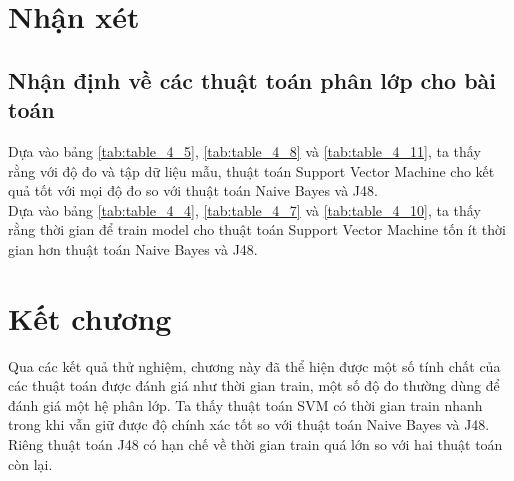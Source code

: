 \section{Nhận xét}
	\subsection{Nhận định về các thuật toán phân lớp cho bài toán}
	Dựa vào bảng \ref{tab:table_4_5}, \ref{tab:table_4_8} và \ref{tab:table_4_11}, ta thấy rằng với độ đo và tập dữ liệu mẫu, thuật toán Support Vector Machine cho kết quả tốt với mọi độ đo so với thuật toán Naive Bayes và J48.\\
	Dựa vào bảng \ref{tab:table_4_4}, \ref{tab:table_4_7} và \ref{tab:table_4_10}, ta thấy rằng thời gian để train model cho thuật toán Support Vector Machine tốn ít thời gian hơn thuật toán Naive Bayes và J48.
\section{Kết chương}
Qua các kết quả thử nghiệm, chương này đã thể hiện được một số tính chất của các thuật toán được đánh giá như thời gian train, một số độ đo thường dùng để đánh giá một hệ phân lớp. Ta thấy thuật toán SVM có thời gian train nhanh trong khi vẫn giữ được độ chính xác tốt so với thuật toán Naive Bayes và J48. Riêng thuật toán J48 có hạn chế về thời gian train quá lớn so với hai thuật toán còn lại.